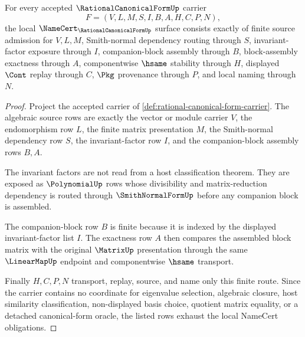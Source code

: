 \begin{theorem}
\label{thm:rational-canonical-form-namecert-obligations}
For every accepted $\RationalCanonicalFormUp$ carrier
$$
F=(V,L,M,S,I,B,A,H,C,P,N),
$$
the local $\NameCert_{\RationalCanonicalFormUp}$ surface consists exactly of finite source admission for $V,L,M$, Smith-normal dependency routing through $S$, invariant-factor exposure through $I$, companion-block assembly through $B$, block-assembly exactness through $A$, componentwise $\hsame$ stability through $H$, displayed $\Cont$ replay through $C$, $\Pkg$ provenance through $P$, and local naming through $N$.
\end{theorem}
\begin{proof}
Project the accepted carrier of \autoref{def:rational-canonical-form-carrier}. The algebraic source rows are exactly the vector or module carrier $V$, the endomorphism row $L$, the finite matrix presentation $M$, the Smith-normal dependency row $S$, the invariant-factor row $I$, and the companion-block assembly rows $B,A$.

The invariant factors are not read from a host classification theorem. They are exposed as $\PolynomialUp$ rows whose divisibility and matrix-reduction dependency is routed through $\SmithNormalFormUp$ before any companion block is assembled.

The companion-block row $B$ is finite because it is indexed by the displayed invariant-factor list $I$. The exactness row $A$ then compares the assembled block matrix with the original $\MatrixUp$ presentation through the same $\LinearMapUp$ endpoint and componentwise $\hsame$ transport.

Finally $H,C,P,N$ transport, replay, source, and name only this finite route. Since the carrier contains no coordinate for eigenvalue selection, algebraic closure, host similarity classification, non-displayed basis choice, quotient matrix equality, or a detached canonical-form oracle, the listed rows exhaust the local NameCert obligations.
\end{proof}



